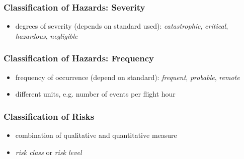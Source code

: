 \documentclass[a4paper, 10pt]{article}
\begin{document}
\subsubsection*{Classification of Hazards: Severity}
\begin{itemize}
    \item degrees of severity (depends on standard used): \emph{catastrophic}, \emph{critical}, \emph{hazardous}, \emph{negligible}
\end{itemize}

\subsubsection*{Classification of Hazards: Frequency}
\begin{itemize}
    \item frequency of occurrence (depend on standard): \emph{frequent}, \emph{probable}, \emph{remote}
    \item different units, e.g. number of events per flight hour
\end{itemize}

\subsubsection*{Classification of Risks}
\begin{itemize}
    \item combination of qualitative and quantitative measure
    \item[\follows] \emph{risk class} or \emph{risk level}
\end{itemize}
\end{document}
